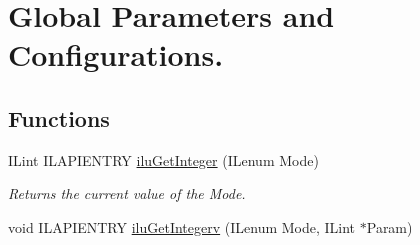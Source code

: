 \hypertarget{group__ilu__state}{\section{Global Parameters and Configurations.}
\label{group__ilu__state}
}
\subsection*{Functions}
\begin{DoxyCompactItemize}
\item 
I\+Lint I\+L\+A\+P\+I\+E\+N\+T\+R\+Y \hyperlink{group__ilu__state_gaecb69a456d72f9c6c449604217142710}{ilu\+Get\+Integer} (I\+Lenum Mode)
\begin{DoxyCompactList}\small\item\em Returns the current value of the {\itshape Mode}. \end{DoxyCompactList}\item 
\hypertarget{group__ilu__state_gad63d708dd1c58cc0c0ef857119879b6d}{void I\+L\+A\+P\+I\+E\+N\+T\+R\+Y \hyperlink{group__ilu__state_gad63d708dd1c58cc0c0ef857119879b6d}{ilu\+Get\+Integerv} (I\+Lenum Mode, I\+Lint $\ast$Param)}\label{group__ilu__state_gad63d708dd1c58cc0c0ef857119879b6d}


\end{DoxyCompactItemize}
